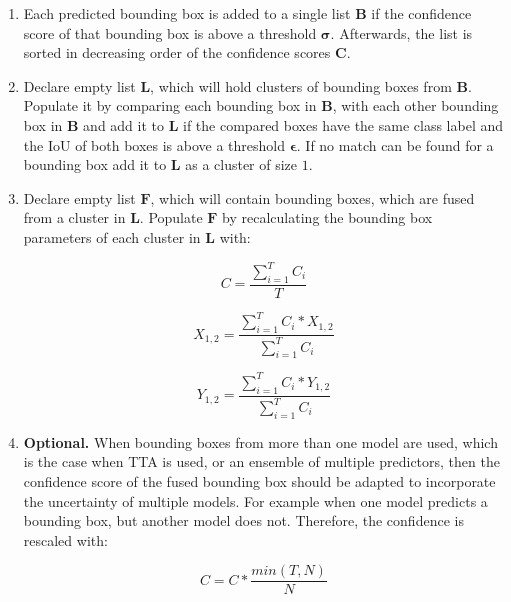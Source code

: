 \begin{enumerate}

    \item Each predicted bounding box is added to a single list $\mathbf{B}$ if the confidence score of that bounding box is above a threshold $\boldsymbol{\sigma}$. Afterwards, the list is sorted in decreasing order of the confidence scores $\mathbf{C}$.

    \item Declare empty list $\mathbf{L}$, which will hold clusters of bounding boxes from $\mathbf{B}$.  Populate it by comparing each bounding box in $\mathbf{B}$, with each other bounding box in $\mathbf{B}$ and add it to $\mathbf{L}$ if the compared boxes have the same class label and the \ac{IoU} of both boxes is above a threshold $\boldsymbol{\epsilon}$. If no match can be found for a bounding box add it to $\mathbf{L}$ as a cluster of size $1$.

    \item Declare empty list $\mathbf{F}$, which will contain bounding boxes, which are fused from a cluster in $\mathbf{L}$. Populate $\mathbf{F}$ by recalculating the bounding box parameters of each cluster in $\mathbf{L}$ with:

    \begin{equation}
        C = \frac{\sum^T_{i=1} C_i}{T}
    \end{equation}

    \begin{equation}
        X_{1,2} = \frac{\sum^T_{i=1} C_i * X_{1,2}}{\sum^T_{i=1} C_i}
    \end{equation}

    \begin{equation}
        Y_{1,2} = \frac{\sum^T_{i=1} C_i * Y_{1,2}}{\sum^T_{i=1} C_i}
    \end{equation}

    \item \textbf{Optional.} When bounding boxes from more than one model are used, which is the case when \ac{TTA} is used, or an ensemble of multiple predictors, then the confidence score of the fused bounding box should be adapted to incorporate the uncertainty of multiple models. For example when one model predicts a bounding box, but another model does not. Therefore, the confidence is rescaled with:

    \begin{equation}
        C = C * \frac{min(T, N)}{N}
        \label{eq:confidence_rescale}
    \end{equation}


\end{enumerate}
